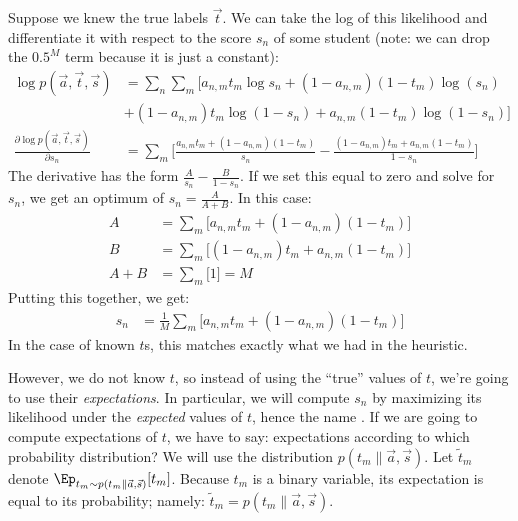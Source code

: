 Suppose we knew the true labels $\vec t$. We can take the log of this likelihood and differentiate it with respect to the score $s_n$ of some student (note: we can drop the $0.5^M$ term because it is just a constant):
~
\begin{align}
\log p(\vec a, \vec t, \vec s)
&= \sum_n \sum_m \Big[
     a_{n,m}t_m \log s_n
 +   (1-a_{n,m})(1-t_m) \log (s_n) \nonumber \\
&+   (1-a_{n,m})t_m \log (1-s_n)
 +   a_{n,m}(1-t_m) \log (1-s_n) \Big]\\
\frac {\partial \log p(\vec a, \vec t, \vec s)} {\partial s_n}
&= \sum_m \Big[
     \frac {a_{n,m} t_m + (1-a_{n,m}) (1-t_m)} {s_n}
   - \frac {(1-a_{n,m}) t_m + a_{n,m} (1-t_m)} {1-s_n} \Big]
\end{align}
%
The derivative has the form $\frac A {s_n} - \frac B {1-s_n}$. If we set this equal to zero and
solve for $s_n$, we get an optimum of $s_n = \frac A {A+B}$. In this case:
%
\begin{align}
  A &= \sum_m \big[ a_{n,m} t_m + (1-a_{n,m}) (1-t_m) \big]\\
  B &= \sum_m \big[ (1-a_{n,m}) t_m + a_{n,m} (1-t_m) \big]\\
A+B &= \sum_m \big[ 1 \big] = M
\end{align}
%
Putting this together, we get:
%
\begin{align}
  s_n &= \frac 1 M \sum_m \big[ a_{n,m} t_m + (1-a_{n,m}) (1-t_m) \big]
\end{align}
%
In the case of known $t$s, this matches exactly what we had in the heuristic.

However, we do not know $t$, so instead of using the ``true'' values of $t$, we're going to use their \emph{expectations}.
In particular, we will compute $s_n$ by maximizing its likelihood under the \emph{expected} values of $t$, hence the name .
%
If we are going to compute expectations of $t$, we have to say: expectations according to which probability distribution?
We will use the distribution $p(t_m \| \vec a, \vec s)$.
Let $\tilde t_m$ denote $\Ep_{t_m \sim p(t_m \| \vec a, \vec s)}[t_m]$.
Because $t_m$ is a binary variable, its expectation is equal to its probability;
namely: $\tilde t_m = p(t_m \| \vec a, \vec s)$.

